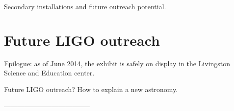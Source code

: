             Secondary installations and future outreach potential.

    \section{Future LIGO outreach}
    \label{future_outreach}

        Epilogue: as of June 2014, the exhibit is safely on display in the Livingston Science and Education center.

        Future LIGO outreach? How to explain a new astronomy.


        --------------------------------------




